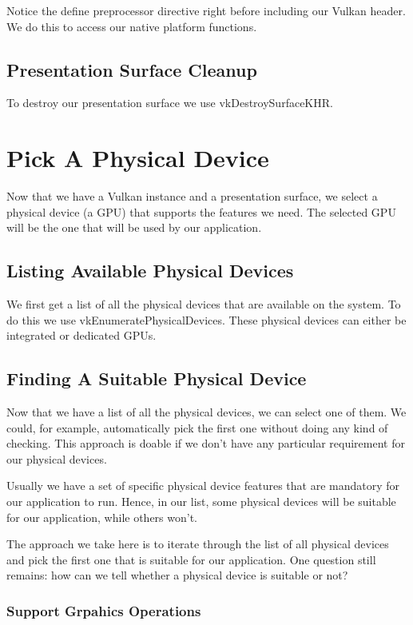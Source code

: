Notice the define preprocessor directive right before including our Vulkan header.
We do this to access our native platform functions.

\subsection{Presentation Surface Cleanup}

To destroy our presentation surface we use vkDestroySurfaceKHR.

\section{Pick A Physical Device}

Now that we have a Vulkan instance and a presentation surface, we select
a physical device (a GPU) that supports the features we need.
The selected GPU will be the one that will be used by our application.

\subsection{Listing Available Physical Devices}

We first get a list of all the physical devices that are available on the
system.
To do this we use vkEnumeratePhysicalDevices.
These physical devices can either be integrated or dedicated GPUs.

\subsection{Finding A Suitable Physical Device}

Now that we have a list of all the physical devices, we can select one of them.
We could, for example, automatically pick the first one without doing any kind
of checking.
This approach is doable if we don't have any particular requirement for our
physical devices.

Usually we have a set of specific physical device features that are mandatory
for our application to run.
Hence, in our list, some physical devices will be suitable for our application, while
others won't.

The approach we take here is to iterate through the list of all physical devices and
pick the first one that is suitable for our application.
One question still remains: how can we tell whether a physical device is suitable or not?

\subsubsection{Support Grpahics Operations}

